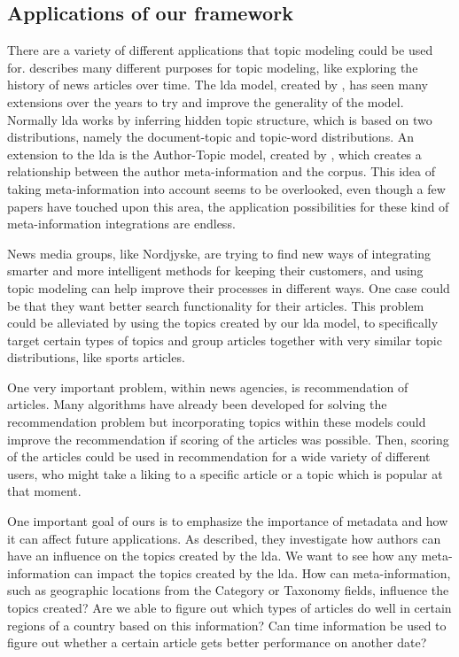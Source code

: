 \subsection{Applications of our framework}\label{sec:appendix_applications}
There are a variety of different applications that topic modeling could be used for. 
\citet{Probabilistic_Topic_Models} describes many different purposes for topic modeling, like exploring the history of news articles over time.
The \gls{lda} model, created by \citet{blei2003latent}, has seen many extensions over the years to try and improve the generality of the model.
Normally \gls{lda} works by inferring hidden topic structure, which is based on two distributions, namely the document-topic and topic-word distributions.
An extension to the \gls{lda} is the Author-Topic model, created by \citet{author_topic_2012}, which creates a relationship between the author meta-information and the corpus.
This idea of taking meta-information into account seems to be overlooked, even though a few papers have touched upon this area, the application possibilities for these kind of meta-information integrations are endless.

News media groups, like Nordjyske, are trying to find new ways of integrating smarter and more intelligent methods for keeping their customers, and using topic modeling can help improve their processes in different ways.
One case could be that they want better search functionality for their articles.
This problem could be alleviated by using the topics created by our \gls{lda} model, to specifically target certain types of topics and group articles together with very similar topic distributions, like sports articles.

One very important problem, within news agencies, is recommendation of articles.
Many algorithms have already been developed for solving the recommendation problem but incorporating topics within these models could improve the recommendation if scoring of the articles was possible.
Then, scoring of the articles could be used in recommendation for a wide variety of different users, who might take a liking to a specific article or a topic which is popular at that moment.

One important goal of ours is to emphasize the importance of metadata and how it can affect future applications.
As \citet{author_topic_2012} described, they investigate how authors can have an influence on the topics created by the \gls{lda}.
We want to see how any meta-information can impact the topics created by the \gls{lda}. 
How can meta-information, such as geographic locations from the Category or Taxonomy fields, influence the topics created?
Are we able to figure out which types of articles do well in certain regions of a country based on this information? 
Can time information be used to figure out whether a certain article gets better performance on another date?
